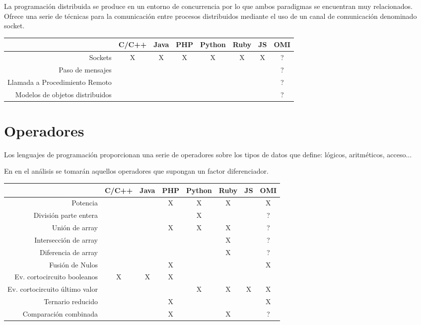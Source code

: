 La programación distribuida se produce en un entorno de concurrencia por lo
que ambos paradigmas se encuentran muy relacionados. Ofrece una serie de técnicas para la comunicación entre procesos distribuidos mediante el uso de un canal de comunicación 
denominado socket. 

\FloatBarrier
\begin{table}[h]
\begin{center}
 
\begin{tabular}{|r|c|c|c|c|c|c|c|} \hline
 & C/C++ & Java & PHP  & Python & Ruby & JS & OMI\\ \hline
Sockets & X & X & X & X & X  & X & ? \\ \hline
Paso de mensajes & & &  &  &  &  & ? \\ \hline
Llamada a Procedimiento Remoto & & &  &  &  &  & ? \\ \hline
Modelos de objetos distribuidos & & &  &  &  &  & ? \\ \hline
\end{tabular}
\end{center}
\end{table}
\FloatBarrier

\section{Operadores}
Los lenguajes de programación proporcionan una serie de operadores sobre los
tipos de datos que define: lógicos, aritméticos, acceso...

En en el análisis se tomarán aquellos operadores que supongan un factor 
diferenciador.

\FloatBarrier
\begin{table}[h]
\begin{center}
 
\begin{tabular}{|r|c|c|c|c|c|c|c|} \hline
 & C/C++ & Java & PHP  & Python & Ruby & JS & OMI\\ \hline
Potencia & & & X & X & X  &  & X \\ \hline
División parte entera & & &  & X &   &  & ? \\ \hline
Unión de array & & & X & X & X  &  & ? \\ \hline
Intersección de array & & &  &  & X  &  & ? \\ \hline
Diferencia de array & & &  &  & X  &  & ? \\ \hline
Fusión de Nulos  & & & X &  &   &  & X \\ \hline
Ev. cortocircuito booleanos & X & X & X &  &   &  &  \\ \hline
Ev. cortocircuito último valor & &  & & X & X  & X & X \\ \hline
Ternario reducido & &  & X &  &   &  & X \\ \hline
Comparación combinada & & & X &  & X  &  & ? \\ \hline
\end{tabular}
\end{center}
\end{table}
\FloatBarrier



